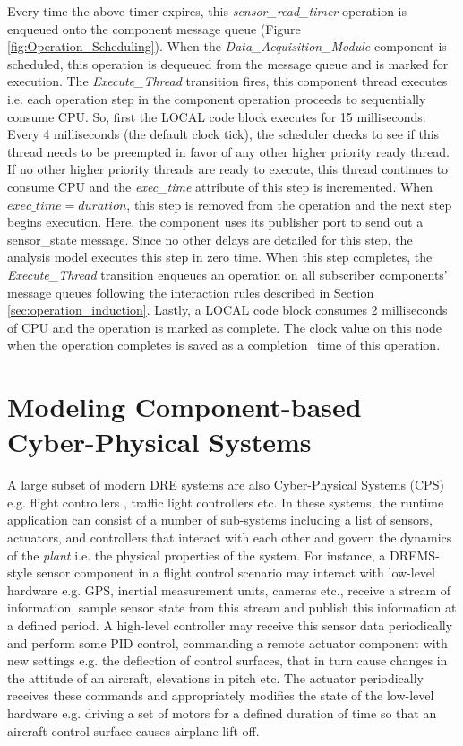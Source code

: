 Every time the above timer expires, this \emph{sensor\_read\_timer} operation is enqueued onto the component message queue (Figure \ref{fig:Operation_Scheduling}). When the \emph{Data\_Acquisition\_Module} component is scheduled, this operation is dequeued from the message queue and is marked for execution. The \emph{Execute\_Thread} transition fires, this component thread executes i.e. each operation step in the component operation proceeds to sequentially consume CPU. So, first the LOCAL code block executes for 15 milliseconds. Every 4 milliseconds (the default clock tick), the scheduler checks to see if this thread needs to be preempted in favor of any other higher priority ready thread. If no other higher priority threads are ready to execute, this thread continues to consume CPU and the \emph{exec\_time} attribute of this step is incremented. When $exec\_time = duration$, this step is removed from the operation and the next step begins execution. Here, the component uses its publisher port to send out a sensor\_state message. Since no other delays are detailed for this step, the analysis model executes this step in zero time. When this step completes, the \emph{Execute\_Thread} transition enqueues an operation on all subscriber components' message queues following the interaction rules described in Section \ref{sec:operation_induction}. Lastly, a LOCAL code block consumes 2 milliseconds of CPU and the operation is marked as complete. The clock value on this node when the operation completes is saved as a completion\_time of this operation.  


\section{Modeling Component-based Cyber-Physical Systems}

A large subset of modern DRE systems are also Cyber-Physical Systems (CPS) e.g. flight controllers \cite{sharp1998reducing}, traffic light controllers \cite{huber1998traffic} etc. In these systems, the runtime application can consist of a number of sub-systems including a list of sensors, actuators, and controllers that interact with each other and govern the dynamics of the \emph{plant} i.e. the physical properties of the system. For instance, a DREMS-style sensor component in a flight control scenario may interact with low-level hardware e.g. GPS, inertial measurement units, cameras etc., receive a stream of information, sample sensor state from this stream and publish this information at a defined period. A high-level controller may receive this sensor data periodically and perform some PID control, commanding a remote actuator component with new settings e.g. the deflection of control surfaces, that in turn cause changes in the attitude of an aircraft, elevations in pitch etc. The actuator periodically receives these commands and appropriately modifies the state of the low-level hardware e.g. driving a set of motors for a defined duration of time so that an aircraft control surface causes airplane lift-off. 

